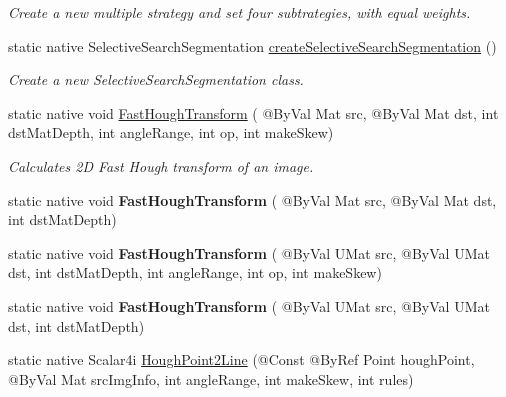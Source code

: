 \begin{DoxyCompactItemize}
\begin{DoxyCompactList}\small\item\em Create a new multiple strategy and set four subtrategies, with equal weights. \end{DoxyCompactList}\item 
static native Selective\+Search\+Segmentation \hyperlink{group__ximgproc__segmentation_gadfa823f2a25d59aaf55b7e0ce50ca67a}{create\+Selective\+Search\+Segmentation} ()
\begin{DoxyCompactList}\small\item\em Create a new Selective\+Search\+Segmentation class. \end{DoxyCompactList}\item 
static native void \hyperlink{classorg_1_1bytedeco_1_1javacpp_1_1opencv__ximgproc_a86b1be8a4536cf9ee5613a180ab05731}{Fast\+Hough\+Transform} ( @By\+Val Mat src, @By\+Val Mat dst, int dst\+Mat\+Depth, int angle\+Range, int op, int make\+Skew)
\begin{DoxyCompactList}\small\item\em Calculates 2D Fast Hough transform of an image. \end{DoxyCompactList}\item 
\mbox{\label{classorg_1_1bytedeco_1_1javacpp_1_1opencv__ximgproc_a7b460f03e6e846c1898c3b0bd3fe54b0}} 
static native void {\bfseries Fast\+Hough\+Transform} ( @By\+Val Mat src, @By\+Val Mat dst, int dst\+Mat\+Depth)
\item 
\mbox{\label{classorg_1_1bytedeco_1_1javacpp_1_1opencv__ximgproc_ada5b094b98a7cd9bb69a0d354ef5a1f6}} 
static native void {\bfseries Fast\+Hough\+Transform} ( @By\+Val U\+Mat src, @By\+Val U\+Mat dst, int dst\+Mat\+Depth, int angle\+Range, int op, int make\+Skew)
\item 
\mbox{\label{classorg_1_1bytedeco_1_1javacpp_1_1opencv__ximgproc_afeffe7892b68efac640829342cd5fabf}} 
static native void {\bfseries Fast\+Hough\+Transform} ( @By\+Val U\+Mat src, @By\+Val U\+Mat dst, int dst\+Mat\+Depth)
\item 
static native Scalar4i \hyperlink{classorg_1_1bytedeco_1_1javacpp_1_1opencv__ximgproc_a15b22eb13c2bff5ab308c1cc895e5f24}{Hough\+Point2\+Line} (@Const @By\+Ref Point hough\+Point, @By\+Val Mat src\+Img\+Info, int angle\+Range, int make\+Skew, int rules)

\end{DoxyCompactItemize}
